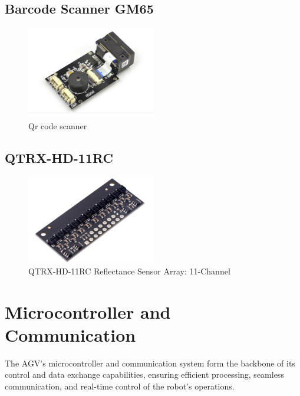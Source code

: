 \documentclass[../../main]{subfiles}
\begin{document}
\subsection{Barcode Scanner GM65}

\begin{figure}[H]
    \centering
    \includegraphics[width=0.5\textwidth]{fig/qr_scanner.png}
    \caption{ Qr code scanner}
    \label{Qr code scanner} %
\end{figure}

\subsection{QTRX-HD-11RC}

\begin{figure}[H]
    \centering
    \includegraphics[width=0.5\textwidth]{fig/array.png}
    \caption{ QTRX-HD-11RC Reflectance Sensor Array: 11-Channel }
    \label{QTRX-HD-11RC Ir Array} %
\end{figure}


\section{Microcontroller and Communication}

The AGV's microcontroller and communication system form the backbone 
of its control and data exchange capabilities, ensuring efficient 
processing, seamless communication, and real-time control of the 
robot's operations. 
\end{document}
